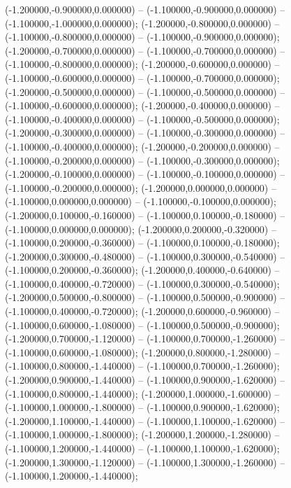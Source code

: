  (-1.200000,-0.900000,0.000000) -- (-1.100000,-0.900000,0.000000) -- (-1.100000,-1.000000,0.000000);
 (-1.200000,-0.800000,0.000000) -- (-1.100000,-0.800000,0.000000) -- (-1.100000,-0.900000,0.000000);
 (-1.200000,-0.700000,0.000000) -- (-1.100000,-0.700000,0.000000) -- (-1.100000,-0.800000,0.000000);
 (-1.200000,-0.600000,0.000000) -- (-1.100000,-0.600000,0.000000) -- (-1.100000,-0.700000,0.000000);
 (-1.200000,-0.500000,0.000000) -- (-1.100000,-0.500000,0.000000) -- (-1.100000,-0.600000,0.000000);
 (-1.200000,-0.400000,0.000000) -- (-1.100000,-0.400000,0.000000) -- (-1.100000,-0.500000,0.000000);
 (-1.200000,-0.300000,0.000000) -- (-1.100000,-0.300000,0.000000) -- (-1.100000,-0.400000,0.000000);
 (-1.200000,-0.200000,0.000000) -- (-1.100000,-0.200000,0.000000) -- (-1.100000,-0.300000,0.000000);
 (-1.200000,-0.100000,0.000000) -- (-1.100000,-0.100000,0.000000) -- (-1.100000,-0.200000,0.000000);
 (-1.200000,0.000000,0.000000) -- (-1.100000,0.000000,0.000000) -- (-1.100000,-0.100000,0.000000);
 (-1.200000,0.100000,-0.160000) -- (-1.100000,0.100000,-0.180000) -- (-1.100000,0.000000,0.000000);
 (-1.200000,0.200000,-0.320000) -- (-1.100000,0.200000,-0.360000) -- (-1.100000,0.100000,-0.180000);
 (-1.200000,0.300000,-0.480000) -- (-1.100000,0.300000,-0.540000) -- (-1.100000,0.200000,-0.360000);
 (-1.200000,0.400000,-0.640000) -- (-1.100000,0.400000,-0.720000) -- (-1.100000,0.300000,-0.540000);
 (-1.200000,0.500000,-0.800000) -- (-1.100000,0.500000,-0.900000) -- (-1.100000,0.400000,-0.720000);
 (-1.200000,0.600000,-0.960000) -- (-1.100000,0.600000,-1.080000) -- (-1.100000,0.500000,-0.900000);
 (-1.200000,0.700000,-1.120000) -- (-1.100000,0.700000,-1.260000) -- (-1.100000,0.600000,-1.080000);
 (-1.200000,0.800000,-1.280000) -- (-1.100000,0.800000,-1.440000) -- (-1.100000,0.700000,-1.260000);
 (-1.200000,0.900000,-1.440000) -- (-1.100000,0.900000,-1.620000) -- (-1.100000,0.800000,-1.440000);
 (-1.200000,1.000000,-1.600000) -- (-1.100000,1.000000,-1.800000) -- (-1.100000,0.900000,-1.620000);
 (-1.200000,1.100000,-1.440000) -- (-1.100000,1.100000,-1.620000) -- (-1.100000,1.000000,-1.800000);
 (-1.200000,1.200000,-1.280000) -- (-1.100000,1.200000,-1.440000) -- (-1.100000,1.100000,-1.620000);
 (-1.200000,1.300000,-1.120000) -- (-1.100000,1.300000,-1.260000) -- (-1.100000,1.200000,-1.440000);
